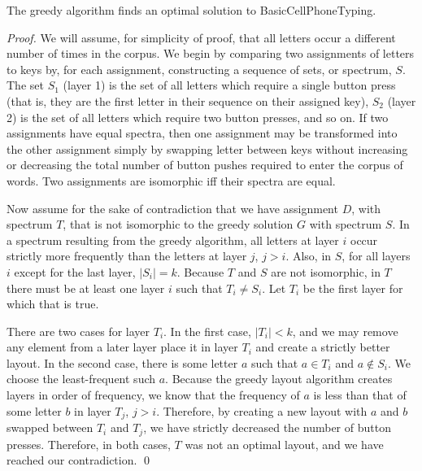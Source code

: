 \documentclass[runningheads]{llncs}
\begin{document}
\begin{theorem}
The greedy algorithm finds an optimal solution to {\sc BasicCellPhoneTyping}.
\label{basicthm}
\end{theorem}
\begin{proof}
We will assume, for simplicity of proof, that all letters occur a different
number of times in the corpus.  We begin by comparing two assignments of
letters to keys by, for each assignment, constructing a sequence of sets, or
spectrum, $S$.  The set $S_1$ (layer 1) is the set of all letters which require
a single button press (that is, they are the first letter in their sequence on
their assigned key), $S_2$ (layer 2) is the set of all letters which require
two button presses, and so on.  If two assignments have equal spectra, then one
assignment may be transformed into the other assignment simply by swapping
letter between keys without increasing or decreasing the total number of button
pushes required to enter the corpus of words.   Two assignments are isomorphic
iff their spectra are equal.

Now assume for the sake of contradiction that we have assignment $D$, with
spectrum $T$, that is not isomorphic to the greedy solution $G$ with spectrum
$S$.  In a spectrum resulting from the greedy algorithm, all letters at
layer $i$ occur strictly more frequently than the letters at layer $j$, $j >
i$.  Also, in $S$, for all layers $i$ except for the last layer, $|S_i| = k$.
Because $T$ and $S$ are not isomorphic, in $T$ there must be at least one layer
$i$ such that $T_i \neq S_i$.  Let $T_i$ be the first layer for which that is
true.

There are two cases for layer $T_i$.  In the first case, $|T_i| < k$, and we
may remove any element from a later layer place it in layer $T_i$ and create a
strictly better layout.  In the second case, there is some letter $a$ such that
$a \in T_i$ and $a \not\in S_i$.  We choose the least-frequent such $a$.
Because the greedy layout algorithm creates layers in order of frequency, we
know that the frequency of $a$ is less than that of some letter $b$ in layer
$T_j$, $j>i$.  Therefore, by creating a new layout with $a$ and $b$ swapped
between $T_i$ and $T_j$, we have strictly decreased the number of button
presses.  Therefore, in both cases, $T$ was not an optimal layout, and we have
reached our contradiction.  \qed \end{proof}
\end{document}
